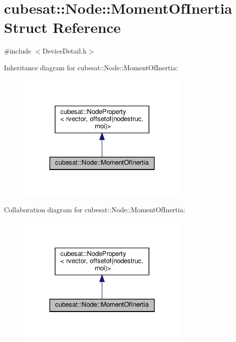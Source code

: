 \hypertarget{structcubesat_1_1Node_1_1MomentOfInertia}{}\section{cubesat\+:\+:Node\+:\+:Moment\+Of\+Inertia Struct Reference}
\label{structcubesat_1_1Node_1_1MomentOfInertia}


{\ttfamily \#include $<$Device\+Detail.\+h$>$}



Inheritance diagram for cubesat\+:\+:Node\+:\+:Moment\+Of\+Inertia\+:
\nopagebreak
\begin{figure}[H]
\begin{center}
\leavevmode
\includegraphics[width=239pt]{structcubesat_1_1Node_1_1MomentOfInertia__inherit__graph}
\end{center}
\end{figure}


Collaboration diagram for cubesat\+:\+:Node\+:\+:Moment\+Of\+Inertia\+:
\nopagebreak
\begin{figure}[H]
\begin{center}
\leavevmode
\includegraphics[width=239pt]{structcubesat_1_1Node_1_1MomentOfInertia__coll__graph}
\end{center}
\end{figure}
